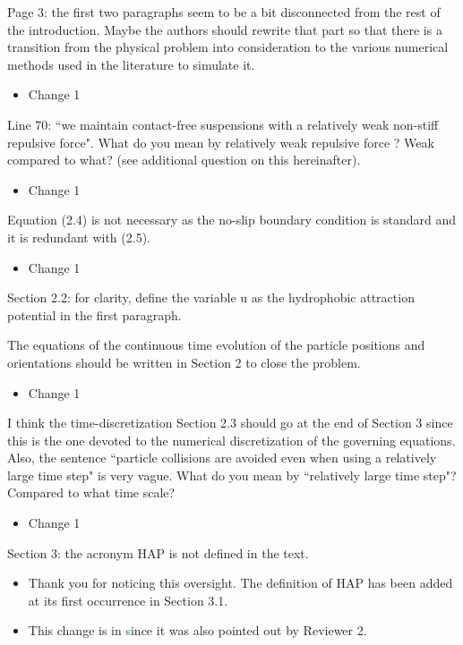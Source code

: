 \documentclass[11pt]{article}
\newcommand{\comment}[1]{{\color{blue} #1}}
\begin{document}
\noindent
\comment{Page 3: the first two paragraphs seem to be a bit disconnected
from the rest of the introduction. Maybe the authors should rewrite that
part so that there is a transition from the physical problem into
consideration to the various numerical methods used in the literature to
simulate it.}
\begin{itemize}
  \item Change 1 
\end{itemize}

\noindent
\comment{Line 70: ``we maintain contact-free suspensions with a
relatively weak non-stiff repulsive force". What do you mean by
relatively weak repulsive force ? Weak compared to what? (see additional
question on this hereinafter).}
\begin{itemize}
  \item Change 1 
\end{itemize}

\noindent
\comment{Equation (2.4) is not necessary as the no-slip boundary
condition is standard and it is redundant with (2.5).}
\begin{itemize}
  \item Change 1 
\end{itemize}

\noindent
\comment{Section 2.2: for clarity, define the variable u as the
hydrophobic attraction potential in the first paragraph.}

\noindent
\comment{The equations of the continuous time evolution of the particle
positions and orientations should be written in Section 2 to close the
problem.}
\begin{itemize}
  \item Change 1 
\end{itemize}

\noindent
\comment{I think the time-discretization Section 2.3 should go at the
end of Section 3 since this is the one devoted to the numerical
discretization of the governing equations. Also, the sentence ``particle
collisions are avoided even when using a relatively large time step" is
very vague.  What do you mean by ``relatively large time step"? Compared
to what time scale?}
\begin{itemize}
  \item Change 1 
\end{itemize}

\noindent
\comment{Section 3: the acronym HAP is not defined in the text.}
\begin{itemize}
  \item Thank you for noticing this oversight. The definition of HAP has
    been added at its first occurrence in Section 3.1. 
  \item This change is in \textcolor{green} since it was also pointed
    out by Reviewer 2.
\end{itemize}
\end{document}
